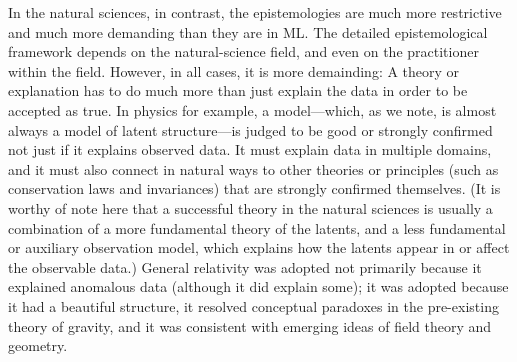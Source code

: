 \documentclass[10pt]{article}
\begin{document}
In the natural sciences, in contrast, the epistemologies are much more restrictive and much more demanding than they are in ML.
The detailed epistemological framework depends on the natural-science field, and even on the practitioner within the field.
However, in all cases, it is more demainding:
A theory or explanation has to do much more than just explain the data in order to be accepted as true.
In physics for example, a model---which, as we note, is almost always a model of latent structure---is judged to be good or strongly confirmed not just if it explains observed data.
It must explain data in multiple domains, and it must also connect in natural ways to other theories or principles (such as conservation laws and invariances) that are strongly confirmed themselves.
(It is worthy of note here that a successful theory in the natural sciences is usually a combination of a more fundamental theory of the latents, and a less fundamental or auxiliary observation model, which explains how the latents appear in or affect the observable data.)
General relativity \cite{gr} was adopted not primarily because it explained anomalous data (although it did explain some); it was adopted because it had a beautiful structure, it resolved conceptual paradoxes in the pre-existing theory of gravity, and it was consistent with emerging ideas of field theory and geometry.
\end{document}
